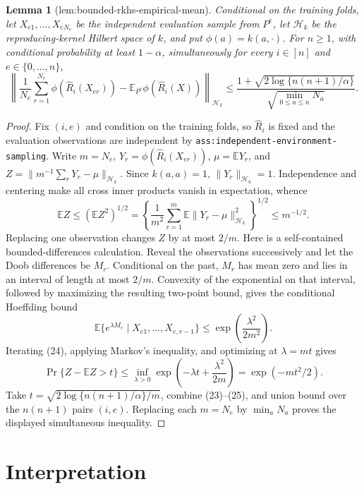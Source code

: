 \documentclass{article}
\newtheorem{lemma}{Lemma}
\begin{document}
\begin{lemma}[lem:bounded-rkhs-empirical-mean]\label{lem:bounded-rkhs-empirical-mean}
Conditional on the training folds, let \(X_{e1},\ldots,X_{eN_e}\) be the independent evaluation sample from \(P^e\), let \(\mathcal H_k\) be the reproducing-kernel Hilbert space of \(k\), and put \(\phi(a)=k(a,\cdot)\).  For \(n\ge1\), with conditional probability at least \(1-\alpha\), simultaneously for every \(i\in[n]\) and \(e\in\{0,\ldots,n\}\),
\[
 \left\|\frac1{N_e}\sum_{r=1}^{N_e}\phi(\widehat R_i(X_{er}))
 -\mathbb E_{P^e}\phi(\widehat R_i(X))\right\|_{\mathcal H_k}
 \le
 \frac{1+\sqrt{2\log\{n(n+1)/\alpha\}}}{\sqrt{\min_{0\le a\le n}N_a}}.
\]
\end{lemma}
\begin{proof}
Fix \((i,e)\) and condition on the training folds, so \(\widehat R_i\) is fixed and the evaluation observations are independent by \texttt{ass:independent-environment-sampling}.  Write \(m=N_e\), \(Y_r=\phi(\widehat R_i(X_{er}))\), \(\mu=\mathbb E Y_r\), and \(Z=\|m^{-1}\sum_rY_r-\mu\|_{\mathcal H_k}\).  Since \(k(a,a)=1\), \(\|Y_r\|_{\mathcal H_k}=1\).  Independence and centering make all cross inner products vanish in expectation, whence
\[
 \mathbb E Z
 \le (\mathbb E Z^2)^{1/2}
 =\left\{\frac1{m^2}\sum_{r=1}^m
 \mathbb E\|Y_r-\mu\|_{\mathcal H_k}^2\right\}^{1/2}
 \le m^{-1/2}.
\tag{23}
\]
Replacing one observation changes \(Z\) by at most \(2/m\).  Here is a self-contained bounded-differences calculation.  Reveal the observations successively and let the Doob differences be \(M_r\).  Conditional on the past, \(M_r\) has mean zero and lies in an interval of length at most \(2/m\).  Convexity of the exponential on that interval, followed by maximizing the resulting two-point bound, gives the conditional Hoeffding bound
\[
 \mathbb E\{e^{\lambda M_r}\mid X_{e1},\ldots,X_{e,r-1}\}
 \le \exp\!\left(\frac{\lambda^2}{2m^2}\right).
\tag{24}
\]
Iterating (24), applying Markov's inequality, and optimizing at \(\lambda=mt\) gives
\[
 \Pr\{Z-\mathbb EZ>t\}
 \le\inf_{\lambda>0}\exp\!\left(-\lambda t+\frac{\lambda^2}{2m}\right)
 =\exp(-mt^2/2).
\tag{25}
\]
Take \(t=\sqrt{2\log\{n(n+1)/\alpha\}/m}\), combine (23)--(25), and union bound over the \(n(n+1)\) pairs \((i,e)\).  Replacing each \(m=N_e\) by \(\min_aN_a\) proves the displayed simultaneous inequality.
\end{proof}

\section{Interpretation}
\end{document}

